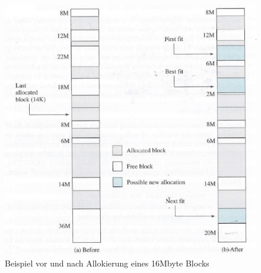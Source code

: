 \documentclass[a4paper]{scrreprt}
\begin{document}
\begin{figure}[ht]
\centering
\includegraphics[scale=0.55]{graphics/allocationexample.png}
\caption{Beispiel vor und nach Allokierung eines 16Mbyte Blocks}
\end{figure}
\end{document}

